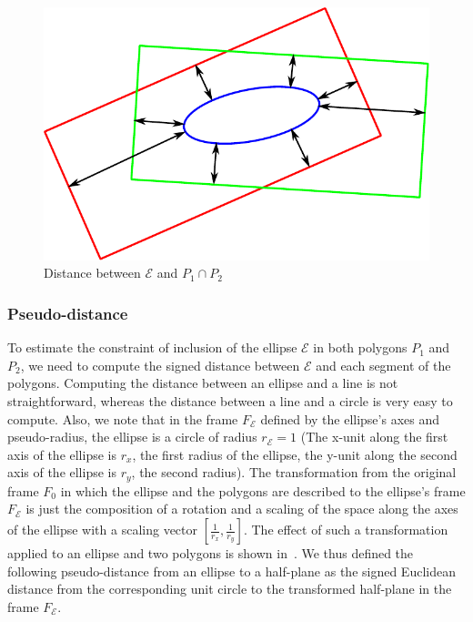 %
\begin{figure}[!htb]
  \centering
  \includegraphics[width=0.2\columnwidth]{distance.pdf}
  \caption{Distance between $\mathcal{E}$ and $P_1 \cap P_2$}
\label{fig:distance}
\end{figure}

\subsubsection{Pseudo-distance}
\label{subsubsec:formulation}
To estimate the constraint of inclusion of the ellipse $\mathcal{E}$ in both polygons $P_1$ and $P_2$, we need to compute the signed distance between $\mathcal{E}$ and each segment of the polygons.
Computing the distance between an ellipse and a line is not straightforward, whereas the distance between a line and a circle is very easy to compute.
Also, we note that in the frame $F_\mathcal{E}$ defined by the ellipse's axes and pseudo-radius, the ellipse is a circle of radius $r_{\mathcal{E}}=1$ (The x-unit along the first axis of the ellipse is $r_x$, the first radius of the ellipse, the y-unit along the second axis of the ellipse is $r_y$, the second radius).
The transformation from the original frame $F_0$ in which the ellipse and the polygons are described to the ellipse's frame $F_\mathcal{E}$ is just the composition of a rotation and a scaling of the space along the axes of the ellipse with a scaling vector $[\frac{1}{r_x}, \frac{1}{r_y}]$.
The effect of such a transformation applied to an ellipse and two polygons is shown in~.
We thus defined the following pseudo-distance from an ellipse to a half-plane as the signed Euclidean distance from the corresponding unit circle to the transformed half-plane in the frame $F_\mathcal{E}$.

